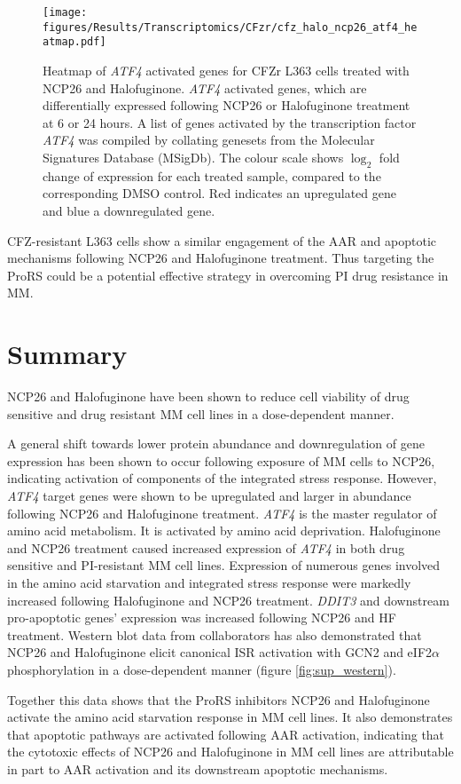 \begin{figure}[p]
\centering
\texttt{[image: figures/Results/Transcriptomics/CFzr/cfz\_halo\_ncp26\_atf4\_heatmap.pdf]}
\caption[Heatmap of \textit{ATF4} activated genes for ProRS treated CFZr cells]{Heatmap of \textit{ATF4} activated genes for CFZr L363 cells treated with NCP26 and Halofuginone.
\textit{ATF4} activated genes, which are differentially expressed following NCP26 or Halofuginone treatment at 6 or 24 hours.
A list of genes activated by the transcription factor \textit{ATF4} was compiled by collating genesets from the Molecular Signatures Database (MSigDb).
The colour scale shows $\log_{2}$ fold change of expression for each treated sample, compared to the corresponding DMSO control.
Red indicates an upregulated gene and blue a downregulated gene.
}
\label{fig:cfz_atf4_heatmap}
\end{figure}

CFZ-resistant L363 cells show a similar engagement of the AAR and apoptotic mechanisms following NCP26 and Halofuginone treatment.
Thus targeting the ProRS could be a potential effective strategy in overcoming PI drug resistance in MM\@.

\clearpage
\section{Summary}
NCP26 and Halofuginone have been shown to reduce cell viability of drug sensitive and drug resistant MM cell lines in a dose-dependent manner.

A general shift towards lower protein abundance and downregulation of gene expression has been shown to occur following exposure of MM cells to NCP26, indicating activation of components of the integrated stress response.
However, \textit{ATF4} target genes were shown to be upregulated and larger in abundance following NCP26 and Halofuginone treatment.
\textit{ATF4} is the master regulator of amino acid metabolism.
It is activated by amino acid deprivation.
Halofuginone and NCP26 treatment caused increased expression of \textit{ATF4} in both drug sensitive and PI-resistant MM cell lines.
Expression of numerous genes involved in the amino acid starvation and integrated stress response were markedly increased following Halofuginone and NCP26 treatment.
\textit{DDIT3} and downstream pro-apoptotic genes' expression was increased following NCP26 and HF treatment.
Western blot data from collaborators has also demonstrated that NCP26 and Halofuginone elicit canonical ISR activation with GCN2 and eIF2$\alpha$ phosphorylation in a dose-dependent manner (figure \ref{fig:sup_western}).

Together this data shows that the ProRS inhibitors NCP26 and Halofuginone activate the amino acid starvation response in MM cell lines.
It also demonstrates that apoptotic pathways are activated following AAR activation, indicating that the cytotoxic effects of NCP26 and Halofuginone in MM cell lines are attributable in part to AAR activation and its downstream apoptotic mechanisms.
